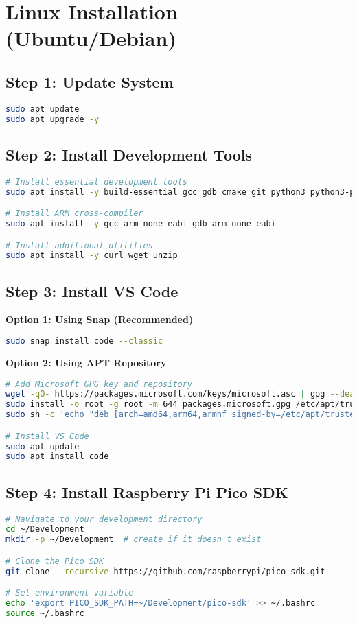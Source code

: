 \documentclass[11pt,a4paper]{article}
\begin{document}
\section{Linux Installation (Ubuntu/Debian)}

\subsection{Step 1: Update System}
\begin{lstlisting}[language=bash]
sudo apt update
sudo apt upgrade -y
\end{lstlisting}

\subsection{Step 2: Install Development Tools}
\begin{lstlisting}[language=bash]
# Install essential development tools
sudo apt install -y build-essential gcc gdb cmake git python3 python3-pip

# Install ARM cross-compiler
sudo apt install -y gcc-arm-none-eabi gdb-arm-none-eabi

# Install additional utilities
sudo apt install -y curl wget unzip
\end{lstlisting}

\subsection{Step 3: Install VS Code}
\textbf{Option 1: Using Snap (Recommended)}
\begin{lstlisting}[language=bash]
sudo snap install code --classic
\end{lstlisting}

\textbf{Option 2: Using APT Repository}
\begin{lstlisting}[language=bash]
# Add Microsoft GPG key and repository
wget -qO- https://packages.microsoft.com/keys/microsoft.asc | gpg --dearmor > packages.microsoft.gpg
sudo install -o root -g root -m 644 packages.microsoft.gpg /etc/apt/trusted.gpg.d/
sudo sh -c 'echo "deb [arch=amd64,arm64,armhf signed-by=/etc/apt/trusted.gpg.d/packages.microsoft.gpg] https://packages.microsoft.com/repos/code stable main" > /etc/apt/sources.list.d/vscode.list'

# Install VS Code
sudo apt update
sudo apt install code
\end{lstlisting}

\subsection{Step 4: Install Raspberry Pi Pico SDK}
\begin{lstlisting}[language=bash]
# Navigate to your development directory
cd ~/Development
mkdir -p ~/Development  # create if it doesn't exist

# Clone the Pico SDK
git clone --recursive https://github.com/raspberrypi/pico-sdk.git

# Set environment variable
echo 'export PICO_SDK_PATH=~/Development/pico-sdk' >> ~/.bashrc
source ~/.bashrc
\end{lstlisting}
\end{document}
